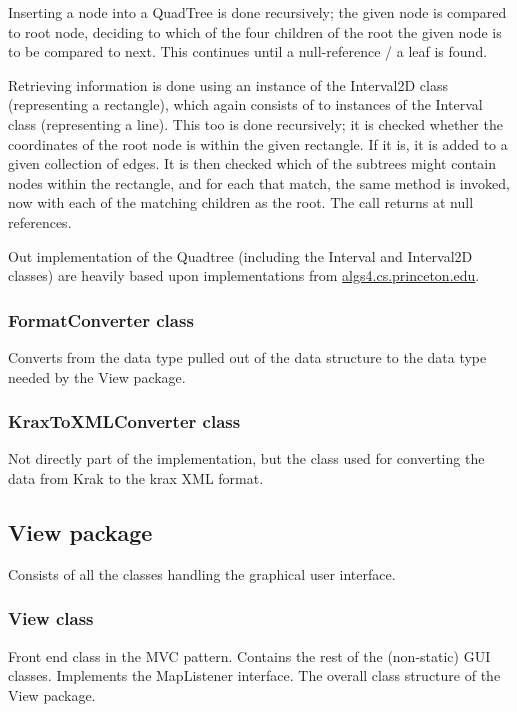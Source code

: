 \documentclass[a4paper,11pt]{article}
\begin{document}
Inserting a node into a QuadTree is done recursively; the given node is compared to root node, deciding to which of the four children of the root the given node is to be compared to next. This continues until a null-reference / a leaf is found.

Retrieving information is done using an instance of the Interval2D class (representing a rectangle), which again consists of to instances of the Interval class (representing a line). This too is done recursively; it is checked whether the coordinates of the root node is within the given rectangle. If it is, it is added to a given collection of edges. It is then checked which of the subtrees might contain nodes within the rectangle, and for each that match, the same method is invoked, now with each of the matching children as the root. The call returns at null references.

Out implementation of the Quadtree (including the Interval and Interval2D classes) are heavily based upon implementations from
\url{algs4.cs.princeton.edu}. 

\subsubsection{FormatConverter class} %
Converts from the data type pulled out of the data structure to the data type needed by the View package.

\subsubsection{KraxToXMLConverter class} %
Not directly part of the implementation, but the class used for converting the data from Krak to the krax XML format.

\subsection{View package} %
Consists of all the classes handling the graphical user interface.

\subsubsection{View class} %
Front end class in the MVC pattern. Contains the rest of the (non-static) GUI classes. Implements the MapListener interface. The overall class structure of the View package.
\end{document}

